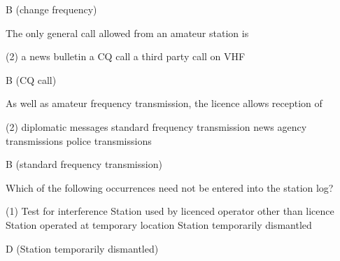 \documentclass[a4paper]{article}
\begin{document}
\begin{solution}
	B (change frequency)
\end{solution}

\vspace{5mm}



\begin{question}The only general call allowed from an amateur station is
	\begin{tasks}(2)
		\task a news bulletin
		\task a CQ call
		\task a third party call
		\task on VHF
	\end{tasks}
\end{question}

\begin{solution}
	B (CQ call)
\end{solution}

\vspace{5mm}



\begin{question}As well as amateur frequency transmission, the licence allows reception of
	\begin{tasks}(2)
		\task diplomatic messages
		\task standard frequency transmission
		\task news agency transmissions
		\task police transmissions
	\end{tasks}
\end{question}

\begin{solution}
	B (standard frequency transmission)
\end{solution}

\vspace{5mm}



\begin{question}Which of the following occurrences need not be entered into the station log?
	\begin{tasks}(1)
		\task Test for interference
		\task Station used by licenced operator other than licence
		\task Station operated at temporary location
		\task Station temporarily dismantled
	\end{tasks}
\end{question}

\begin{solution}
	D (Station temporarily dismantled)
\end{solution}

\vspace{5mm}
\end{document}
